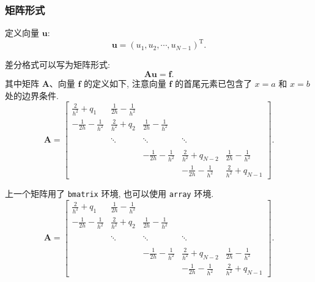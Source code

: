 \documentclass[zihao=-4]{ctexart}
\numberwithin{equation}{section}
\numberwithin{figure}{section}
\numberwithin{table}{section}
\theoremstyle{plain}
\begin{document}
\subsubsection{矩阵形式}

定义向量 $\boldsymbol{u}$:
\begin{equation*}
  \boldsymbol{u}=(u_{1}, u_{2}, \cdots, u_{N-1})^{\mathrm{T}}.
\end{equation*}

差分格式可以写为矩阵形式:
\begin{equation*}
  \boldsymbol{A}\boldsymbol{u}=\boldsymbol{f}.
\end{equation*}
其中矩阵 $\boldsymbol{A}$、向量 $\boldsymbol{f}$ 的定义如下, 注意向量 $\boldsymbol{f}$ 的首尾元素已包含了 $x=a$ 和 $x=b$ 处的边界条件.
\begin{equation}\label{eq:matrix1}
\boldsymbol{A}=\begin{bmatrix}
\frac{2}{h^{2}}+q_{1} & \frac{1}{2h}-\frac{1}{h^{2}} &   &  &  \\[8pt]
 -\frac{1}{2h}-\frac{1}{h^{2}} & \frac{2}{h^{2}}+q_{2} & \frac{1}{2h}-\frac{1}{h^{2}}  & &  \\[8pt]
  &  &  &  &    \\
  &  \ddots  & \ddots  &  \ddots  &  \\[8pt]
  &  &  &  &    \\
  &   & -\frac{1}{2h}-\frac{1}{h^{2}} & \frac{2}{h^{2}}+q_{N-2}& \frac{1}{2h}-\frac{1}{h^{2}} \\[8pt]
  &  &  & -\frac{1}{2h}-\frac{1}{h^{2}} & \frac{2}{h^{2}}+q_{N-1}
\end{bmatrix}.
\end{equation}

上一个矩阵用了 \verb|bmatrix| 环境, 也可以使用 \verb|array| 环境.
\begin{equation}\label{eq:matrix2}
\boldsymbol{A}=\left[\begin{array}{cccccc}
\frac{2}{h^{2}}+q_{1} & \frac{1}{2h}-\frac{1}{h^{2}} &  &  &  \\[8pt]
 -\frac{1}{2h}-\frac{1}{h^{2}} & \frac{2}{h^{2}}+q_{2} & \frac{1}{2h}-\frac{1}{h^{2}}  & &  \\[8pt]
  &  &  &  &   \\
  &  \ddots  & \ddots & \ddots &  \\[8pt]
  &  &  &  &   \\
  &   & -\frac{1}{2h}-\frac{1}{h^{2}} & \frac{2}{h^{2}}+q_{N-2} & \frac{1}{2h}-\frac{1}{h^{2}} \\[8pt]
  &  &  & -\frac{1}{2h}-\frac{1}{h^{2}} & \frac{2}{h^{2}}+q_{N-1}
\end{array}\right].
\end{equation}
\end{document}
